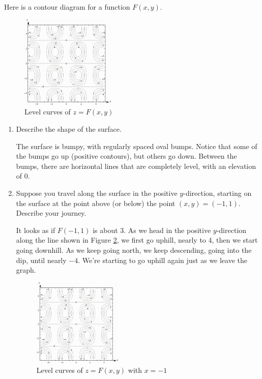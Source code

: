 \begin{example}
Here is a contour diagram for a function $F(x,y)$.

\begin{figure}[!ht]
  \centering
    \includegraphics[width=0.4\textwidth]{img/chap4/image027.png}
    \caption{Level curves of $z=F(x, y)$}
    \label{fig:4-1-contour9}
  \end{figure}
  \begin{enumerate}[label=(\alph*)]
    \item Describe the shape of the surface.
    \begin{solution}
      The surface is bumpy, with regularly spaced oval bumps. Notice that some of the bumps go up (positive contours), but others go down. Between the bumps, there are horizontal lines that are completely level, with an elevation of 0.
    \end{solution}
    \item Suppose you travel along the surface in the positive $y$-direction, starting on the surface at the point above (or below) the point $(x,y)=(-1,1)$. Describe your journey.
    \begin{solution}
      It looks as if $F(-1,1)$ is about 3. As we head in the positive $y$-direction along the line shown in Figure \ref{fig:4-1-contour10}, we first go uphill, nearly to 4, then we start going downhill. As we keep going north, we keep descending, going into the dip, until nearly $-4$. We're starting to go uphill again just as we leave the graph.

      \begin{figure}[!ht]
        \centering
          \includegraphics[width=0.4\textwidth]{img/chap4/image028.png}
          \caption{Level curves of $z=F(x, y)$ with $x=-1$}
          \label{fig:4-1-contour10}
        \end{figure}
      \end{solution}
    \end{enumerate}
\end{example}

